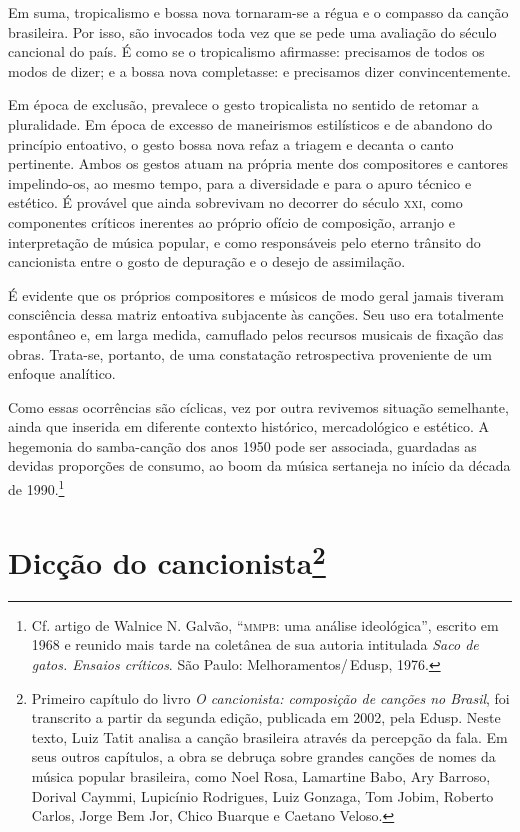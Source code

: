 Em suma, tropicalismo e bossa nova tornaram-se a régua e o compasso da
canção brasileira. Por isso, são invocados toda vez que se pede uma
avaliação do século cancional do país. É como se o tropicalismo
afirmasse: precisamos de todos os modos de dizer; e a bossa nova
completasse: e precisamos dizer convincentemente. 

Em época de exclusão, prevalece o gesto tropicalista no sentido de retomar a pluralidade. Em
época de excesso de maneirismos estilísticos e de abandono do princípio
entoativo, o gesto bossa nova refaz a triagem e decanta o canto
pertinente. Ambos os gestos atuam na própria mente dos compositores e
cantores impelindo-os, ao mesmo tempo, para a diversidade e para o apuro
técnico e estético. É provável que ainda sobrevivam no decorrer do
século \textsc{xxi}, como componentes críticos inerentes ao próprio ofício de
composição, arranjo e interpretação de música popular, e como
responsáveis pelo eterno trânsito do cancionista entre o gosto de
depuração e o desejo de assimilação.

É evidente que os próprios compositores e músicos de modo geral
jamais tiveram consciência dessa matriz entoativa subjacente às canções.
Seu uso era totalmente espontâneo e, em larga medida, camuflado pelos
recursos musicais de fixação das obras. Trata-se, portanto, de uma
constatação retrospectiva proveniente de um enfoque analítico.

Como essas ocorrências são cíclicas, vez por outra revivemos
situação semelhante, ainda que inserida em diferente contexto histórico,
mercadológico e estético. A hegemonia do samba-canção dos anos 1950 pode
ser associada, guardadas as devidas proporções de consumo, ao boom da
música sertaneja no início da década de 1990.\footnote{Cf. artigo de Walnice N. Galvão, ``\textsc{mmpb}: uma análise ideológica'', escrito em 1968 e reunido mais tarde na coletânea de sua autoria intitulada \textit{Saco de gatos. Ensaios críticos}. São Paulo: Melhoramentos/\,Edusp, 1976.}

\chapter{Dicção do cancionista\footnote{Primeiro capítulo do livro \textit{O cancionista: composição de canções no Brasil}, foi transcrito a partir da segunda edição, publicada em 2002, pela Edusp. Neste texto, Luiz Tatit analisa a canção brasileira através da percepção da fala. Em seus outros capítulos, a obra se debruça sobre grandes canções de nomes da música popular brasileira, como Noel Rosa, Lamartine Babo, Ary Barroso, Dorival Caymmi, Lupicínio Rodrigues, Luiz Gonzaga, Tom Jobim, Roberto Carlos, Jorge Bem Jor, Chico Buarque e Caetano Veloso.}}

